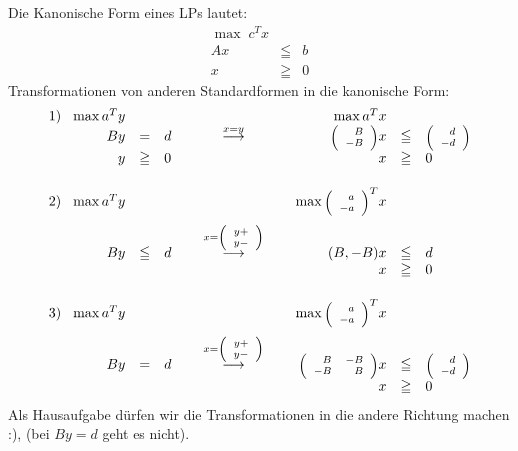 Die Kanonische Form eines LPs lautet:
\[\begin{array}{lcl}
\max\; c^{T}x\\
A x&\leqq& b\\
x&\geqq& 0
\end{array}\]
Transformationen von anderen Standardformen in die kanonische Form:
\[\begin{array}{l@{\hspace{3mm}}rcl@{\hspace{8mm}}c@{\hspace{8mm}}rcl}
1)&\max  a^{T}y&&&&\max a^{T}x\\
&B y&=&d&\stackrel{x=y}{\longrightarrow}&\mbox{\scriptsize$\left(\begin{array}{r}B\\-B\\\end{array}
\right)$}x&\leqq&\mbox{\scriptsize$\left(\begin{array}{r}d\\-d\end{array}
\right)$}\\
&y&\geqq& 0&&x&\geqq& 0\vspace{5mm}\\
2)&\max a^{T}y&&&&\max \mbox{\scriptsize$\left(\begin{array}{r}a\\-a\end{array}\right)$}^{T}x\vspace{2mm}\\
&B y&\leqq&d&\stackrel{x=\mbox{\scriptsize$\left(\begin{array}{r}y+\\y-\end{array}
\right)$}}{\longrightarrow}&(B, -B)x&\leqq& d\\
&&&&&x&\geqq& 0\vspace{5mm}\\
3)&\max a^{T}y&&&&\max
\mbox{\scriptsize$\left(\begin{array}{r}a\\-a\end{array}\right)$}^{T}x\vspace{2mm}\\
&B y&=&d&\stackrel{x=\mbox{\scriptsize$\left(\begin{array}{r}y+\\y-\end{array}
\right)$}}{\longrightarrow}&   
\mbox{\scriptsize$\left(\begin{array}{rr}B&-B\\-B&B\end{array}\right)$}
x&\leqq& \mbox{\scriptsize$\left(\begin{array}{r}d\\-d\end{array}
\right)$}\\
&&&&&x&\geqq& 0
\end{array}\]
Als Hausaufgabe dürfen wir die Transformationen in die andere Richtung
machen :), (bei $B y=d$ geht es nicht).

